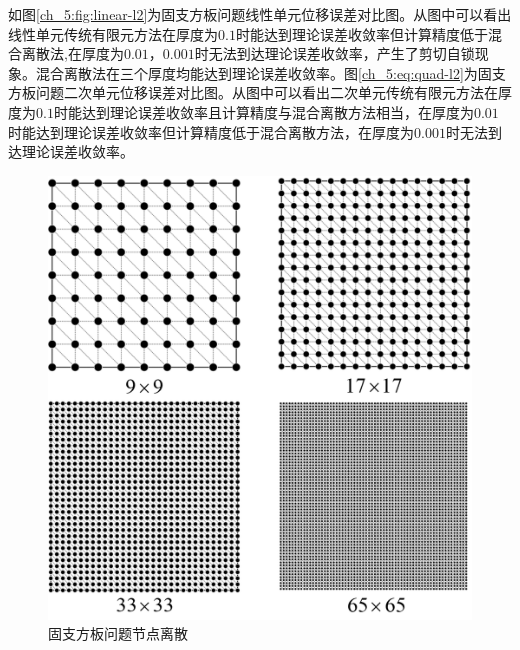 如图\ref{ch_5:fig:linear-l2}为固支方板问题线性单元位移误差对比图。从图中可以看出线性单元传统有限元方法在厚度为$0.1$时能达到理论误差收敛率但计算精度低于混合离散法,在厚度为$0.01$，$0.001$时无法到达理论误差收敛率，产生了剪切自锁现象。混合离散法在三个厚度均能达到理论误差收敛率。图\ref{ch_5:eq:quad-l2}为固支方板问题二次单元位移误差对比图。从图中可以看出二次单元传统有限元方法在厚度为$0.1$时能达到理论误差收敛率且计算精度与混合离散方法相当，在厚度为$0.01$时能达到理论误差收敛率但计算精度低于混合离散方法，在厚度为$0.001$时无法到达理论误差收敛率。
\begin{figure}[!h]
    \centering 
    \includegraphics[scale=0.5]{figures/shearlocking/platemsh.png}
    \caption{固支方板问题节点离散}\label{ch_5:fig:platemsh}
\end{figure}
